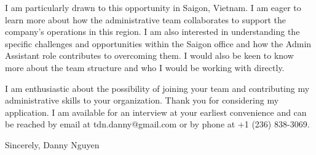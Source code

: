 \documentclass[letterpaper,11pt]{article}
\begin{document}
\vspace{10pt}
I am particularly drawn to this opportunity in Saigon, Vietnam. I am eager to learn more about how the administrative team collaborates to support the company's operations in this region. I am also interested in understanding the specific challenges and opportunities within the Saigon office and how the Admin Assistant role contributes to overcoming them. I would also be keen to know more about the team structure and who I would be working with directly.

\vspace{20pt}
I am enthusiastic about the possibility of joining your team and contributing my administrative skills to your organization. Thank you for considering my application. I am available for an interview at your earliest convenience and can be reached by email at tdn.danny@gmail.com or by phone at +1 (236) 838-3069.

\vspace{40pt} %
Sincerely,
Danny Nguyen

\end{document}
